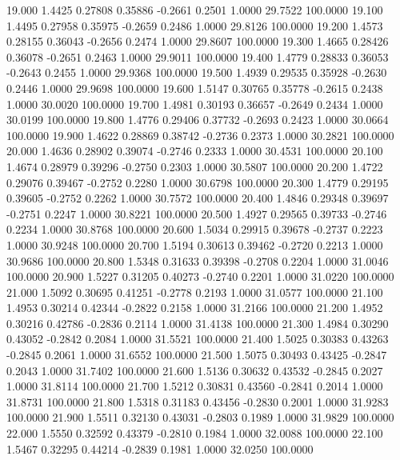   19.000   1.4425   0.27808   0.35886  -0.2661   0.2501   1.0000  29.7522 100.0000
  19.100   1.4495   0.27958   0.35975  -0.2659   0.2486   1.0000  29.8126 100.0000
  19.200   1.4573   0.28155   0.36043  -0.2656   0.2474   1.0000  29.8607 100.0000
  19.300   1.4665   0.28426   0.36078  -0.2651   0.2463   1.0000  29.9011 100.0000
  19.400   1.4779   0.28833   0.36053  -0.2643   0.2455   1.0000  29.9368 100.0000
  19.500   1.4939   0.29535   0.35928  -0.2630   0.2446   1.0000  29.9698 100.0000
  19.600   1.5147   0.30765   0.35778  -0.2615   0.2438   1.0000  30.0020 100.0000
  19.700   1.4981   0.30193   0.36657  -0.2649   0.2434   1.0000  30.0199 100.0000
  19.800   1.4776   0.29406   0.37732  -0.2693   0.2423   1.0000  30.0664 100.0000
  19.900   1.4622   0.28869   0.38742  -0.2736   0.2373   1.0000  30.2821 100.0000
  20.000   1.4636   0.28902   0.39074  -0.2746   0.2333   1.0000  30.4531 100.0000
  20.100   1.4674   0.28979   0.39296  -0.2750   0.2303   1.0000  30.5807 100.0000
  20.200   1.4722   0.29076   0.39467  -0.2752   0.2280   1.0000  30.6798 100.0000
  20.300   1.4779   0.29195   0.39605  -0.2752   0.2262   1.0000  30.7572 100.0000
  20.400   1.4846   0.29348   0.39697  -0.2751   0.2247   1.0000  30.8221 100.0000
  20.500   1.4927   0.29565   0.39733  -0.2746   0.2234   1.0000  30.8768 100.0000
  20.600   1.5034   0.29915   0.39678  -0.2737   0.2223   1.0000  30.9248 100.0000
  20.700   1.5194   0.30613   0.39462  -0.2720   0.2213   1.0000  30.9686 100.0000
  20.800   1.5348   0.31633   0.39398  -0.2708   0.2204   1.0000  31.0046 100.0000
  20.900   1.5227   0.31205   0.40273  -0.2740   0.2201   1.0000  31.0220 100.0000
  21.000   1.5092   0.30695   0.41251  -0.2778   0.2193   1.0000  31.0577 100.0000
  21.100   1.4953   0.30214   0.42344  -0.2822   0.2158   1.0000  31.2166 100.0000
  21.200   1.4952   0.30216   0.42786  -0.2836   0.2114   1.0000  31.4138 100.0000
  21.300   1.4984   0.30290   0.43052  -0.2842   0.2084   1.0000  31.5521 100.0000
  21.400   1.5025   0.30383   0.43263  -0.2845   0.2061   1.0000  31.6552 100.0000
  21.500   1.5075   0.30493   0.43425  -0.2847   0.2043   1.0000  31.7402 100.0000
  21.600   1.5136   0.30632   0.43532  -0.2845   0.2027   1.0000  31.8114 100.0000
  21.700   1.5212   0.30831   0.43560  -0.2841   0.2014   1.0000  31.8731 100.0000
  21.800   1.5318   0.31183   0.43456  -0.2830   0.2001   1.0000  31.9283 100.0000
  21.900   1.5511   0.32130   0.43031  -0.2803   0.1989   1.0000  31.9829 100.0000
  22.000   1.5550   0.32592   0.43379  -0.2810   0.1984   1.0000  32.0088 100.0000
  22.100   1.5467   0.32295   0.44214  -0.2839   0.1981   1.0000  32.0250 100.0000
